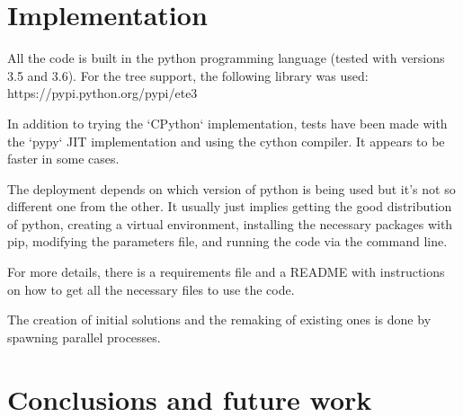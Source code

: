 \documentclass{roadef}
\begin{document}
\section{Implementation} 

    All the code is built in the python programming language (tested with versions 3.5 and 3.6). For the tree support, the following library was used: https://pypi.python.org/pypi/ete3

    In addition to trying the `CPython` implementation, tests have been made with the `pypy` JIT implementation and using the cython compiler. It appears to be faster in some cases.
    
    The deployment depends on which version of python is being used but it's not so different one from the other. It usually just implies getting the good distribution of python, creating a virtual environment, installing the necessary packages with pip, modifying the parameters file, and running the code via the command line.

    For more details, there is a requirements file and a README with instructions on how to get all the necessary files to use the code.

    The creation of initial solutions and the remaking of existing ones is done by spawning parallel processes.

\section{Conclusions and future work} 


% 
\end{document}
